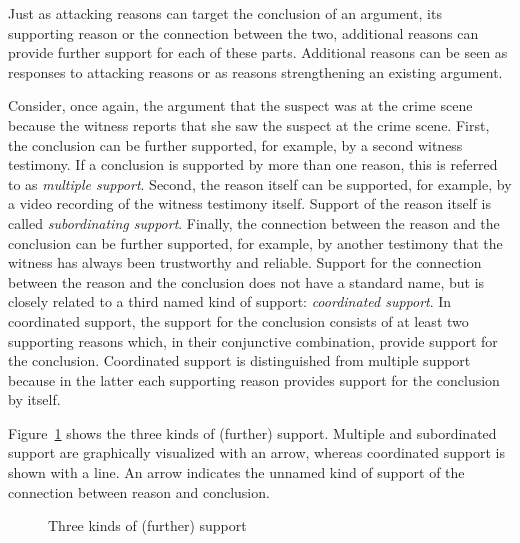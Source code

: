 \documentclass[10pt]{article}
\begin{document}

Just as attacking reasons can target the conclusion of an argument, its supporting
reason or the connection between the two, additional reasons 
can provide further support for each of these parts. %
Additional reasons can be seen as responses to attacking reasons or as reasons strengthening an existing argument. 

Consider, once again, the argument that the suspect was at the crime scene because the witness reports that she saw the suspect at the crime scene. 
First, the conclusion can be further supported, for example, by a second witness testimony. 
If a conclusion is supported by more than one reason, this is referred 
to as \textit{multiple support}. 
%
Second, the reason itself can be supported, for example, 
by a video recording of the witness testimony itself. 
Support of the reason itself is called \textit{subordinating support}. 
%
Finally, the connection between the reason and the conclusion can be further supported, for example, 
by another testimony that the witness has always been trustworthy and reliable. 
Support for the connection between the reason and the conclusion does not have a standard name, but is closely related 
to a third named kind of support: \textit{coordinated support}. In coordinated support, the support for the conclusion consists of at least 
two supporting reasons which, in their conjunctive combination, provide support for the conclusion. Coordinated support is distinguished from multiple support because in the latter each supporting reason 
provides support for the conclusion by itself. 
%

Figure~\ref{fig:support} shows the three kinds of (further) support. Multiple and subordinated support are graphically visualized with an arrow, whereas coordinated support is shown with a line. An arrow indicates the unnamed kind of support of the connection between reason and conclusion.

\begin{figure}[bt]
\centering

\caption{Three kinds of (further) support\label{fig:support}}
\end{figure}

\end{document}
